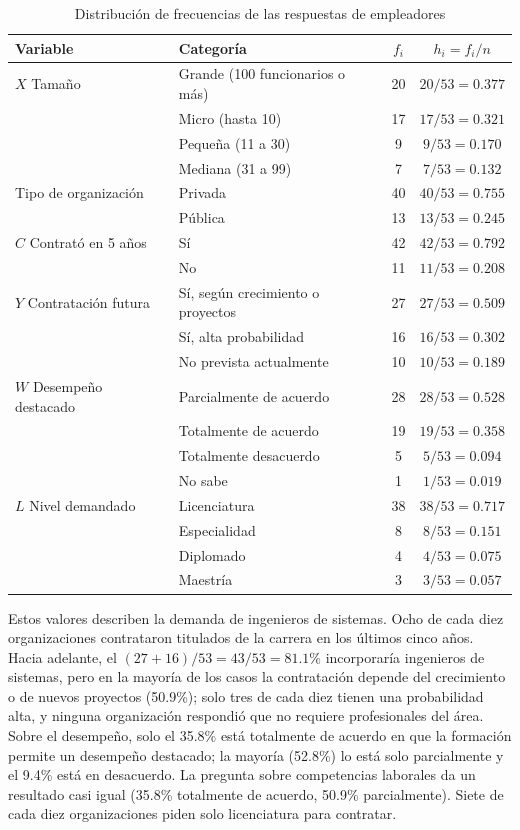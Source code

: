 \documentclass[12pt, a4paper]{article}
\newenvironment{mitabla}[2][H]{%
  \begin{table}[#1]
  \centering
  \caption{#2}
  \small
}{%
  \end{table}
}
\begin{document}
\begin{mitabla}{Distribución de frecuencias de las respuestas de empleadores}\label{tab:a5-frec}
\begin{tabular}{llcc}
\toprule
\textbf{Variable} & \textbf{Categoría} & \textbf{$f_i$} & \textbf{$h_i = f_i/n$} \\
\midrule
$X$ Tamaño & Grande (100 funcionarios o más) & 20 & $20/53 = 0.377$ \\
 & Micro (hasta 10) & 17 & $17/53 = 0.321$ \\
 & Pequeña (11 a 30) & 9 & $9/53 = 0.170$ \\
 & Mediana (31 a 99) & 7 & $7/53 = 0.132$ \\
\midrule
Tipo de organización & Privada & 40 & $40/53 = 0.755$ \\
 & Pública & 13 & $13/53 = 0.245$ \\
\midrule
$C$ Contrató en 5 años & Sí & 42 & $42/53 = 0.792$ \\
 & No & 11 & $11/53 = 0.208$ \\
\midrule
$Y$ Contratación futura & Sí, según crecimiento o proyectos & 27 & $27/53 = 0.509$ \\
 & Sí, alta probabilidad & 16 & $16/53 = 0.302$ \\
 & No prevista actualmente & 10 & $10/53 = 0.189$ \\
\midrule
$W$ Desempeño destacado & Parcialmente de acuerdo & 28 & $28/53 = 0.528$ \\
 & Totalmente de acuerdo & 19 & $19/53 = 0.358$ \\
 & Totalmente desacuerdo & 5 & $5/53 = 0.094$ \\
 & No sabe & 1 & $1/53 = 0.019$ \\
\midrule
$L$ Nivel demandado & Licenciatura & 38 & $38/53 = 0.717$ \\
 & Especialidad & 8 & $8/53 = 0.151$ \\
 & Diplomado & 4 & $4/53 = 0.075$ \\
 & Maestría & 3 & $3/53 = 0.057$ \\
\bottomrule
\end{tabular}
\end{mitabla}

Estos valores describen la demanda de ingenieros de sistemas. Ocho de
cada diez organizaciones contrataron titulados de la carrera en los
últimos cinco años. Hacia adelante, el $(27+16)/53 = 43/53 = 81.1\%$
incorporaría ingenieros de sistemas, pero en la mayoría de los casos la
contratación depende del crecimiento o de nuevos proyectos (50.9\%); solo
tres de cada diez tienen una probabilidad alta, y ninguna organización
respondió que no requiere profesionales del área. Sobre el desempeño,
solo el 35.8\% está totalmente de acuerdo en que la formación permite un
desempeño destacado; la mayoría (52.8\%) lo está solo parcialmente y el
9.4\% está en desacuerdo. La pregunta sobre competencias laborales da un
resultado casi igual (35.8\% totalmente de acuerdo, 50.9\% parcialmente).
Siete de cada diez organizaciones piden solo licenciatura para contratar.
\end{document}
